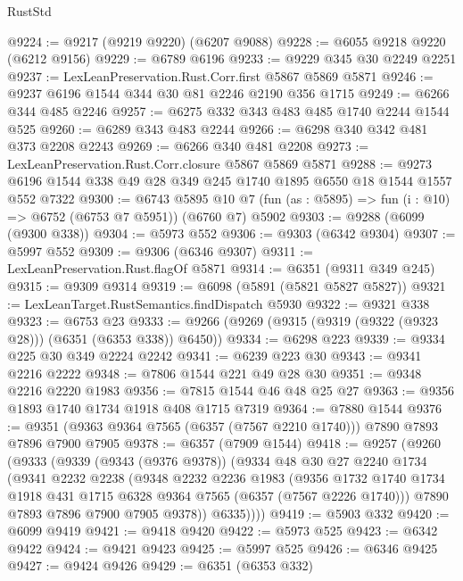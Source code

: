 \begin{lexlean}{RustStd}
\begin{coremodule}
@9224 := @9217 (@9219 @9220) (@6207 @9088)
@9228 := @6055 @9218 @9220 (@6212 @9156)
@9229 := @6789 @6196
@9233 := @9229 @345 @30 @2249 @2251
@9237 := LexLeanPreservation.Rust.Corr.first @5867 @5869 @5871
@9246 := @9237 @6196 @1544 @344 @30 @81 @2246 @2190 @356 @1715
@9249 := @6266 @344 @485 @2246
@9257 := @6275 @332 @343 @483 @485 @1740 @2244 @1544 @525
@9260 := @6289 @343 @483 @2244
@9266 := @6298 @340 @342 @481 @373 @2208 @2243
@9269 := @6266 @340 @481 @2208
@9273 := LexLeanPreservation.Rust.Corr.closure @5867 @5869 @5871
@9288 := @9273 @6196 @1544 @338 @49 @28 @349 @245 @1740 @1895 @6550 @18 @1544 @1557 @552 @7322
@9300 := @6743
    @5895
    @10
    @7
    (fun (as : @5895) => fun (i : @10) => @6752 (@6753 @7 @5951))
    (@6760 @7)
    @5902
@9303 := @9288 (@6099 (@9300 @338))
@9304 := @5973 @552
@9306 := @9303 (@6342 @9304)
@9307 := @5997 @552
@9309 := @9306 (@6346 @9307)
@9311 := LexLeanPreservation.Rust.flagOf @5871
@9314 := @6351 (@9311 @349 @245)
@9315 := @9309 @9314
@9319 := @6098 (@5891 (@5821 @5827 @5827))
@9321 := LexLeanTarget.RustSemantics.findDispatch @5930
@9322 := @9321 @338
@9323 := @6753 @23
@9333 := @9266 (@9269 (@9315 (@9319 (@9322 (@9323 @28))) (@6351 (@6353 @338)) @6450))
@9334 := @6298 @223
@9339 := @9334 @225 @30 @349 @2224 @2242
@9341 := @6239 @223 @30
@9343 := @9341 @2216 @2222
@9348 := @7806 @1544 @221 @49 @28 @30
@9351 := @9348 @2216 @2220 @1983
@9356 := @7815 @1544 @46 @48 @25 @27
@9363 := @9356 @1893 @1740 @1734 @1918 @408 @1715 @7319
@9364 := @7880 @1544
@9376 := @9351 (@9363 @9364 @7565 (@6357 (@7567 @2210 @1740))) @7890 @7893 @7896 @7900 @7905
@9378 := @6357 (@7909 @1544)
@9418 := @9257
    (@9260
      (@9333
        (@9339
          (@9343 (@9376 @9378))
          (@9334
            @48
            @30
            @27
            @2240
            @1734
            (@9341
              @2232
              @2238
              (@9348
                @2232
                @2236
                @1983
                (@9356
                  @1732
                  @1740
                  @1734
                  @1918
                  @431
                  @1715
                  @6328
                  @9364
                  @7565
                  (@6357 (@7567 @2226 @1740)))
                @7890
                @7893
                @7896
                @7900
                @7905
                @9378))
            @6335))))
@9419 := @5903 @332
@9420 := @6099 @9419
@9421 := @9418 @9420
@9422 := @5973 @525
@9423 := @6342 @9422
@9424 := @9421 @9423
@9425 := @5997 @525
@9426 := @6346 @9425
@9427 := @9424 @9426
@9429 := @6351 (@6353 @332)

\end{coremodule}
\end{lexlean}
